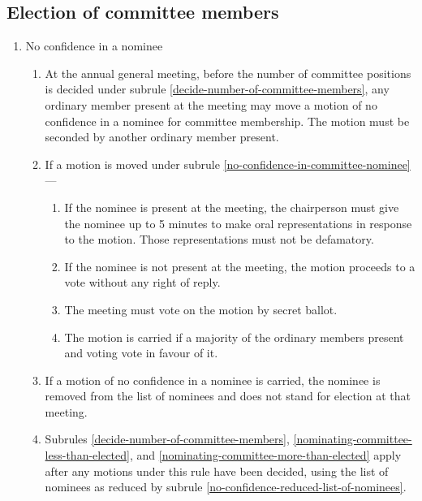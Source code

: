 \documentclass[../constitution.tex]{subfiles}
\begin{document}
\hypertarget{election-of-committee-members}{%
  \subsection{Election of committee members}\label{election-of-committee-members}}

\begin{enumerate}

  \item No confidence in a nominee \label{no-confidence-in-committee-nominee}

        \begin{enumerate}
          \item At the annual general meeting, before the number of committee positions is decided under subrule \ref{decide-number-of-committee-members}, any ordinary member present at the meeting may move a motion of no confidence in a nominee for committee membership. The motion must be seconded by another ordinary member present. \label{raise-no-confidence-motion}
          \item If a motion is moved under subrule \ref{no-confidence-in-committee-nominee} ---
                \begin{enumerate}
                  \item If the nominee is present at the meeting, the chairperson must give the nominee up to 5 minutes to make oral representations in response to the motion. Those representations must not be defamatory.
                  \item If the nominee is not present at the meeting, the motion proceeds to a vote without any right of reply.
                  \item The meeting must vote on the motion by secret ballot.
                  \item The motion is carried if a majority of the ordinary members present and voting vote in favour of it.
                \end{enumerate}
          \item If a motion of no confidence in a nominee is carried, the nominee is removed from the list of nominees and does not stand for election at that meeting. \label{no-confidence-reduced-list-of-nominees}
          \item Subrules \ref{decide-number-of-committee-members}, \ref{nominating-committee-less-than-elected}, and \ref{nominating-committee-more-than-elected} apply after any motions under this rule have been decided, using the list of nominees as reduced by subrule \ref{no-confidence-reduced-list-of-nominees}.

\end{enumerate}
\end{enumerate}
\end{document}

